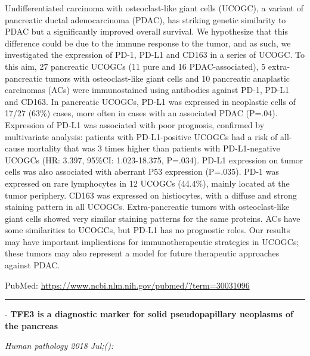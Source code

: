\documentclass[]{article}
\begin{document}
Undifferentiated carcinoma with osteoclast-like giant cells (UCOGC), a
variant of pancreatic ductal adenocarcinoma (PDAC), has striking genetic
similarity to PDAC but a significantly improved overall survival. We
hypothesize that this difference could be due to the immune response to
the tumor, and as such, we investigated the expression of PD-1, PD-L1
and CD163 in a series of UCOGC. To this aim, 27 pancreatic UCOGCs (11
pure and 16 PDAC-associated), 5 extra-pancreatic tumors with
osteoclast-like giant cells and 10 pancreatic anaplastic carcinomas
(ACs) were immunostained using antibodies against PD-1, PD-L1 and CD163.
In pancreatic UCOGCs, PD-L1 was expressed in neoplastic cells of 17/27
(63\%) cases, more often in cases with an associated PDAC (P=.04).
Expression of PD-L1 was associated with poor prognosis, confirmed by
multivariate analysis: patients with PD-L1-positive UCOGCs had a risk of
all-cause mortality that was 3 times higher than patients with
PD-L1-negative UCOGCs (HR: 3.397, 95\%CI: 1.023-18.375, P=.034). PD-L1
expression on tumor cells was also associated with aberrant P53
expression (P=.035). PD-1 was expressed on rare lymphocytes in 12 UCOGCs
(44.4\%), mainly located at the tumor periphery. CD163 was expressed on
histiocytes, with a diffuse and strong staining pattern in all UCOGCs.
Extra-pancreatic tumors with osteoclast-like giant cells showed very
similar staining patterns for the same proteins. ACs have some
similarities to UCOGCs, but PD-L1 has no prognostic roles. Our results
may have important implications for immunotherapeutic strategies in
UCOGCs; these tumors may also represent a model for future therapeutic
approaches against PDAC.

PubMed: \url{https://www.ncbi.nlm.nih.gov/pubmed/?term=30031096}

{}

{}

\begin{center}\rule{0.5\linewidth}{\linethickness}\end{center}

 - \textbf{TFE3 is a diagnostic marker for solid pseudopapillary
neoplasms of the pancreas}

\emph{Human pathology 2018 Jul;():}
\end{document}
